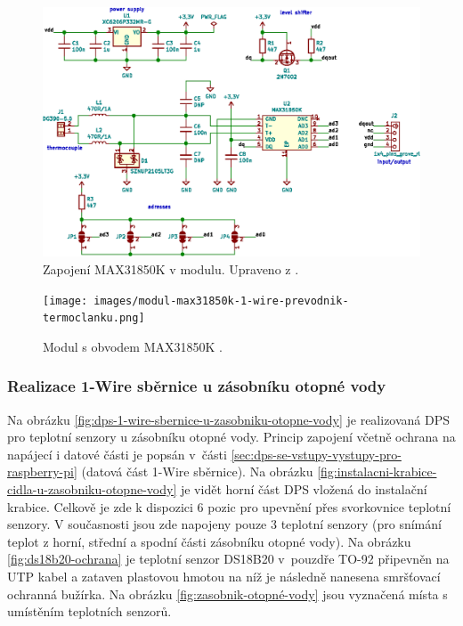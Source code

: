 \begin{figure}[H]
    \centering
    \includegraphics[width=\textwidth]{images/svg/kicad/zapojeni-max31850k-1-wire-prevodnik-termoclanku.eps}
    \caption[Zapojení MAX31850K v modulu.]{Zapojení MAX31850K v modulu. Upraveno z \cite{prevodnik-max31850k}.}
    \label{fig:zapojeni-max31850k-1-wire-prevodnik-termoclanku}
\end{figure}

\begin{figure}[H]
    \centering
    \texttt{[image: images/modul-max31850k-1-wire-prevodnik-termoclanku.png]}
    \caption[Modul s obvodem MAX31850K.]{Modul s obvodem MAX31850K \cite{prevodnik-max31850k}.}
    \label{fig:modul-max31850k-1-wire-prevodnik-termoclanku}
\end{figure}

\subsubsection{Realizace 1-Wire sběrnice u zásobníku otopné vody}
Na obrázku \ref{fig:dps-1-wire-sbernice-u-zasobniku-otopne-vody} je realizovaná DPS pro teplotní senzory u zásobníku otopné vody. Princip zapojení včetně ochrana na napájecí i datové části je popsán v~části \ref{sec:dps-se-vstupy-vystupy-pro-raspberry-pi} (datová část 1-Wire sběrnice). Na obrázku \ref{fig:instalacni-krabice-cidla-u-zasobniku-otopne-vody} je vidět horní část DPS vložená do instalační krabice. Celkově je zde k dispozici 6 pozic pro upevnění přes svorkovnice teplotní senzory. V současnosti jsou zde napojeny pouze 3 teplotní senzory (pro snímání teplot z horní, střední a spodní části zásobníku otopné vody). Na obrázku \ref{fig:ds18b20-ochrana} je teplotní senzor DS18B20 v~pouzdře TO-92 připevněn na UTP kabel a zataven plastovou hmotou na níž je následně nanesena smršťovací ochranná bužírka. Na obrázku \ref{fig:zasobnik-otopné-vody} jsou vyznačená místa s umístěním teplotních senzorů.

